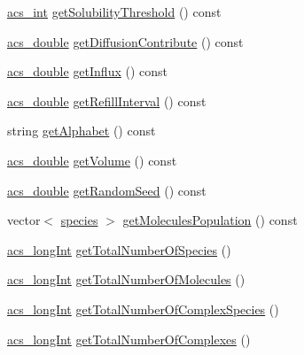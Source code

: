 \begin{DoxyCompactItemize}
\item 
\hyperlink{acs__headers_8h_a8d277355641a098190360234e2ebde35}{acs\-\_\-int} \hyperlink{classenvironment_a6df38337d38f2f714be7058a2a31202c}{get\-Solubility\-Threshold} () const 
\item 
\hyperlink{acs__headers_8h_ab776853a005fcbf56af0424a2a4dd607}{acs\-\_\-double} \hyperlink{classenvironment_a46193e153bd5dcc37fb35346cb7fd971}{get\-Diffusion\-Contribute} () const 
\item 
\hyperlink{acs__headers_8h_ab776853a005fcbf56af0424a2a4dd607}{acs\-\_\-double} \hyperlink{classenvironment_a6f0b4481779cd12dbcd8155916c7d703}{get\-Influx} () const 
\item 
\hyperlink{acs__headers_8h_ab776853a005fcbf56af0424a2a4dd607}{acs\-\_\-double} \hyperlink{classenvironment_a469a7ce80a1e9e5fae77b46b66dfee18}{get\-Refill\-Interval} () const 
\item 
string \hyperlink{classenvironment_add8478cfc878c3aa5a57b2a71357a088}{get\-Alphabet} () const 
\item 
\hyperlink{acs__headers_8h_ab776853a005fcbf56af0424a2a4dd607}{acs\-\_\-double} \hyperlink{classenvironment_a355b53cbc86aaab2a6d114980162ac0e}{get\-Volume} () const 
\item 
\hyperlink{acs__headers_8h_ab776853a005fcbf56af0424a2a4dd607}{acs\-\_\-double} \hyperlink{classenvironment_ab6952f7f6fd971ece0a8661733cfc2b3}{get\-Random\-Seed} () const 
\item 
vector$<$ \hyperlink{classspecies}{species} $>$ \hyperlink{classenvironment_adb12eb52af74ea1fdfe0cd195109fe83}{get\-Molecules\-Population} () const 
\item 
\hyperlink{acs__headers_8h_a19319d75f02db4308bc5c0026d98cd85}{acs\-\_\-long\-Int} \hyperlink{classenvironment_a7a321296874fa1320da225cdbbf56a64}{get\-Total\-Number\-Of\-Species} ()
\item 
\hyperlink{acs__headers_8h_a19319d75f02db4308bc5c0026d98cd85}{acs\-\_\-long\-Int} \hyperlink{classenvironment_a57e7ac49955f4717096cb6696ee03a61}{get\-Total\-Number\-Of\-Molecules} ()
\item 
\hyperlink{acs__headers_8h_a19319d75f02db4308bc5c0026d98cd85}{acs\-\_\-long\-Int} \hyperlink{classenvironment_a453d88017912e8b5973310ea2b044266}{get\-Total\-Number\-Of\-Complex\-Species} ()
\item 
\hyperlink{acs__headers_8h_a19319d75f02db4308bc5c0026d98cd85}{acs\-\_\-long\-Int} \hyperlink{classenvironment_ab564c7ddffd3dba896d5b049e1257793}{get\-Total\-Number\-Of\-Complexes} ()
\item 

\end{DoxyCompactItemize}
